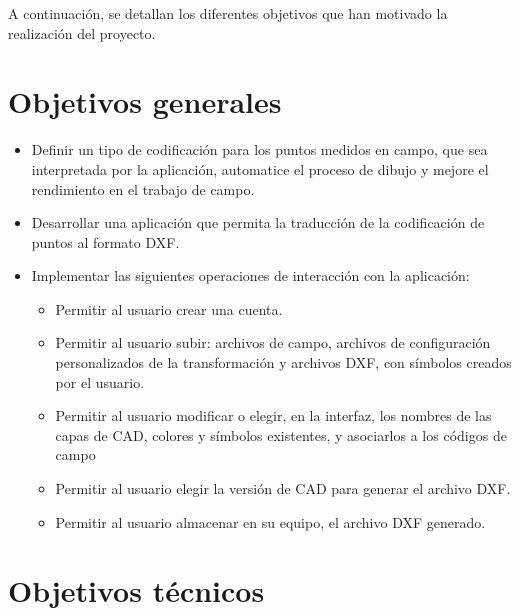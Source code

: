 
A continuación, se detallan los diferentes objetivos que han motivado la realización del proyecto.
\section{Objetivos generales}
\begin{itemize}

	\item Definir un tipo de codificación para los puntos medidos en campo, que sea interpretada por la aplicación, automatice el proceso de dibujo y mejore el rendimiento en el trabajo de campo.
	
	\item Desarrollar una aplicación que permita la traducción de la codificación de puntos al formato DXF.
	
	\item Implementar las siguientes operaciones de interacción con la aplicación:
\begin{itemize}

	\item Permitir al usuario crear una cuenta.

	\item Permitir al usuario subir:  archivos de campo, archivos de configuración personalizados de la transformación y archivos DXF, con símbolos creados por el usuario.

	\item Permitir al usuario modificar o elegir, en la interfaz, los nombres de las capas de CAD, colores y símbolos existentes, y asociarlos a los códigos de campo

	\item Permitir al usuario elegir la versión de CAD para generar el archivo DXF.

	\item Permitir al usuario almacenar en su equipo, el archivo DXF generado.
\end{itemize}

\end{itemize}
\section{Objetivos técnicos}

